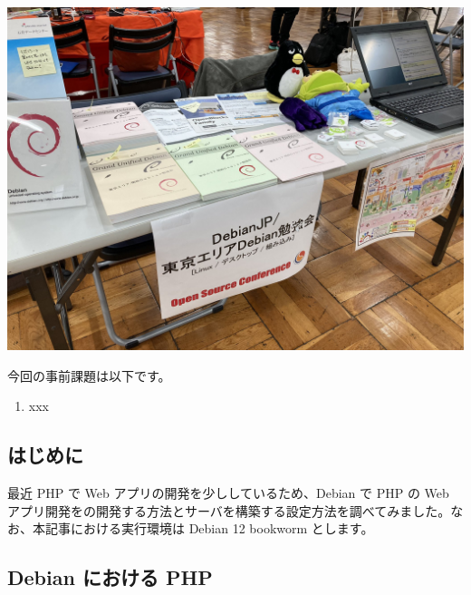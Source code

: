 \documentclass[mingoth,a4paper]{jsarticle}
\begin{document}
\begin{center}
  \includegraphics[width=0.30\hsize]{image202304/osc2023spring-booth.jpg}
\end{center}



今回の事前課題は以下です。

\begin{enumerate}
\item xxx
\end{enumerate}


\begin{multicols}{2}
{\small

}
\end{multicols}

%
%
%
%


      

\subsection{はじめに}

最近 PHP で Web アプリの開発を少ししているため、Debian で PHP の Web アプリ開発をの開発する方法とサーバを構築する設定方法を調べてみました。なお、本記事における実行環境は Debian 12 bookworm とします。

\subsection{Debian における PHP}
\end{document}
